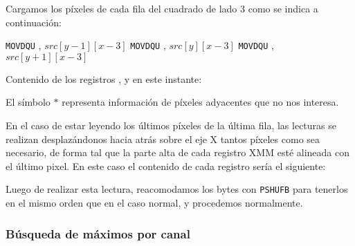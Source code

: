 Cargamos los píxeles de cada fila del cuadrado de lado 3 como se indica a continuación:

\begin{pseudocodigo}
    \STATE \texttt{MOVDQU} , $src[y-1][x-3]$
    \STATE \texttt{MOVDQU} , $src[y][x-3]$
    \STATE \texttt{MOVDQU} , $src[y+1][x-3]$        
\end{pseudocodigo}

Contenido de los registros ,  y  en este instante:

\begin{center}
\end{center}

El símbolo $\ast$ representa información de píxeles adyacentes que no nos interesa.

En el caso de estar leyendo los últimos píxeles de la última fila, las lecturas
se realizan desplazándonos hacia atrás sobre el eje X tantos píxeles como sea
necesario, de forma tal que la parte alta de cada registro XMM esté alineada
con el último pixel. En este caso el contenido de cada registro sería
el siguiente:

\begin{center}
\end{center}

Luego de realizar esta lectura, reacomodamos los bytes con \texttt{PSHUFB}
para tenerlos en el mismo orden que en el caso normal, y procedemos normalmente.



\subsubsection{Búsqueda de máximos por canal}

